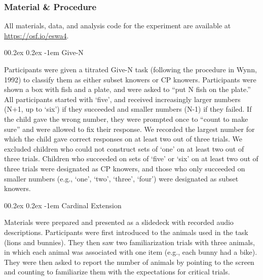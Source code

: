 \documentclass[
  man,floatsintext]{apa7}
\makeatletter
\let\oldparagraph\paragraph
\renewcommand{\paragraph}[1]{\oldparagraph{#1}\mbox{}}
\renewcommand{\paragraph}{\@startsection{paragraph}{4}{\parindent}%
  {0\baselineskip \@plus 0.2ex \@minus 0.2ex}%
  {-1em}%
  {\normalfont\normalsize\bfseries\itshape\typesectitle}}
\renewcommand{\paragraph}{\@startsection{paragraph}{4}{\parindent}%
  {0\baselineskip \@plus 0.2ex \@minus 0.2ex}%
  {-1em}%
  {\normalfont\normalsize\bfseries\typesectitle}}
\makeatother
\begin{document}
\hypertarget{material-procedure}{%
\subsubsection{Material \& Procedure}\label{material-procedure}}

All materials, data, and analysis code for the experiment are available at \url{https://osf.io/eswa4}.

\hypertarget{give-n}{%
\paragraph{Give-N}\label{give-n}}

Participants were given a titrated Give-N task (following the procedure in Wynn, 1992) to classify them as either subset knowers or CP knowers. Participants were shown a box with fish and a plate, and were asked to ``put N fish on the plate.'' All participants started with `five', and received increasingly larger numbers (N+1, up to `six') if they succeeded and smaller numbers (N-1) if they failed. If the child gave the wrong number, they were prompted once to ``count to make sure'' and were allowed to fix their response. We recorded the largest number for which the child gave correct responses on at least two out of three trials. We excluded children who could not construct sets of `one' on at least two out of three trials. Children who succeeded on sets of `five' or `six' on at least two out of three trials were designated as CP knowers, and those who only succeeded on smaller numbers (e.g., `one', `two', `three', `four') were designated as subset knowers.

\hypertarget{cardinal-extension}{%
\paragraph{Cardinal Extension}\label{cardinal-extension}}

Materials were prepared and presented as a slidedeck with recorded audio descriptions. Participants were first introduced to the animals used in the task (lions and bunnies). They then saw two familiarization trials with three animals, in which each animal was associated with one item (e.g., each bunny had a bike). They were then asked to report the number of animals by pointing to the screen and counting to familiarize them with the expectations for critical trials.
\end{document}
